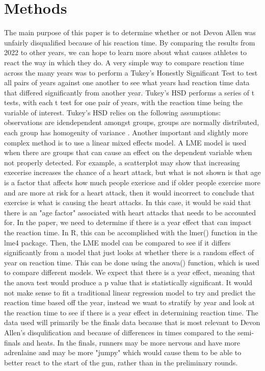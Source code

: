 \documentclass[12pt, letterpaper, titlepage]{article}
\begin{document}
\section{Methods}
\label{sec:methods}
The main purpose of this paper is to determine whether or not Devon Allen was
unfairly disqualified because of his reaction time. By comparing the results from
2022 to other years, we can hope to learn more about what causes athletes to react
the way in which they do.  A very simple way to compare reaction time across the many
years was to perform a Tukey's Honestly Significant Test to test all pairs of
years against one another to see what years had reaction time data that differed
significantly from another year.  Tukey's HSD performs a series of t tests, with
each t test for one pair of years, with the reaction time being the variable of
interest.  Tukey's HSD relies on the following assumptions: observations are
idendependent amongst groups, groups are normally distributed, each group has
homogenity of variance \citep{statistics}.
Another important and slightly more complex
method is to use a linear mixed effects model.  A LME model is used when there
are groups that can cause an effect on the dependent variable when not properly
detected.  For example, a scatterplot may show that increasing execerise
increases the chance of a heart attack, but what is not shown is that age is a
factor that affects how much people exericse and if older people exercise more
and are more at risk for a heart attack, then it would incorrect to conclude
that exercise is what is causing the heart attacks.  In this case, it would be said
that there is an "age factor" associated with heart attacks that needs to be
accounted for.
In the paper, we need to determine if there is a year effect that can impact
the reaction time.  In R, this can be accomplished with the lmer() function
in the lme4 package.  Then, the LME model can be compared to see if it differs
significantly from a model that just looks at whether there is a random effect
of year on reaction time.  This can be done using the anova() function, which
is used to compare different models.  We expect that there is a year effect,
meaning that the anova test would produce a p value that is statistically
significant.  It would not make sense to fit a traditional linear regression
model to try and predict the reaction time based off the year, instead we want
to stratify by year and look at the reaction time to see if there is a year
effect in determining reaction time.
The data used will primarily be the finals data because that is most relevant
to Devon Allen's disqulification and because of differences in times compared
to the semi-finals and heats.  In the finals, runners may be more nervous and
have more adrenlaine and may be more "jumpy" which would cause them to be
able to better react to the start of the gun, rather than in the preliminary
rounds.
\end{document}
